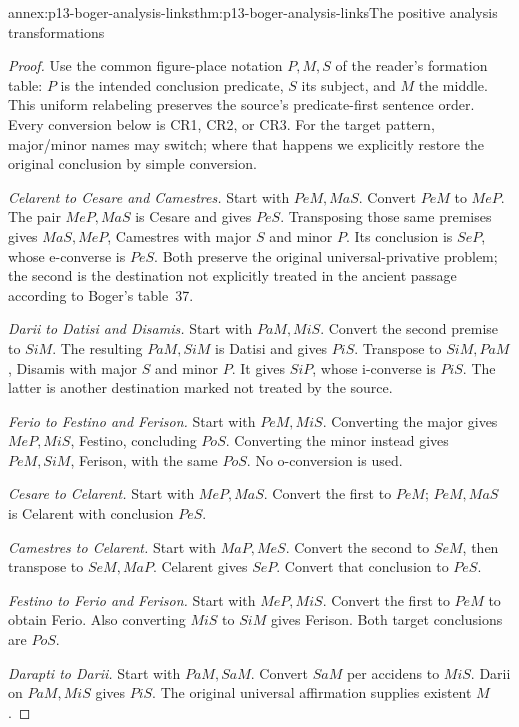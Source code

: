 \begin{annexitem}{annex:p13-boger-analysis-links}{thm:p13-boger-analysis-links}{The positive analysis transformations}
\begin{proof}
Use the common figure-place notation \(P,M,S\) of the reader's formation
table: \(P\) is the intended conclusion predicate, \(S\) its subject,
and \(M\) the middle. This uniform relabeling preserves the source's
predicate-first sentence order. Every conversion below is CR1, CR2, or CR3.
For the target pattern, major/minor names may switch; where that happens
we explicitly restore the original conclusion by simple conversion.

\emph{Celarent to Cesare and Camestres.} Start with \(PeM,MaS\).
Convert \(PeM\) to \(MeP\). The pair \(MeP,MaS\) is Cesare and
gives \(PeS\). Transposing those same premises gives \(MaS,MeP\),
Camestres with major \(S\) and minor \(P\). Its conclusion is \(SeP\),
whose e-converse is \(PeS\). Both preserve the original universal-privative
problem; the second is the destination not explicitly treated in the
ancient passage according to Boger's table~37.

\emph{Darii to Datisi and Disamis.} Start with \(PaM,MiS\).
Convert the second premise to \(SiM\). The resulting \(PaM,SiM\)
is Datisi and gives \(PiS\). Transpose to \(SiM,PaM\), Disamis with
major \(S\) and minor \(P\). It gives \(SiP\), whose i-converse is
\(PiS\). The latter is another destination marked not treated by the source.

\emph{Ferio to Festino and Ferison.} Start with \(PeM,MiS\).
Converting the major gives \(MeP,MiS\), Festino, concluding \(PoS\).
Converting the minor instead gives \(PeM,SiM\), Ferison, with the same
\(PoS\). No o-conversion is used.

\emph{Cesare to Celarent.} Start with \(MeP,MaS\).
Convert the first to \(PeM\); \(PeM,MaS\) is Celarent with conclusion
\(PeS\).

\emph{Camestres to Celarent.} Start with \(MaP,MeS\).
Convert the second to \(SeM\), then transpose to \(SeM,MaP\).
Celarent gives \(SeP\). Convert that conclusion to \(PeS\).

\emph{Festino to Ferio and Ferison.} Start with \(MeP,MiS\).
Convert the first to \(PeM\) to obtain Ferio. Also converting \(MiS\)
to \(SiM\) gives Ferison. Both target conclusions are \(PoS\).

\emph{Darapti to Darii.} Start with \(PaM,SaM\).
Convert \(SaM\) per accidens to \(MiS\). Darii on \(PaM,MiS\)
gives \(PiS\). The original universal affirmation supplies existent \(M\).


\end{proof}
\end{annexitem}
